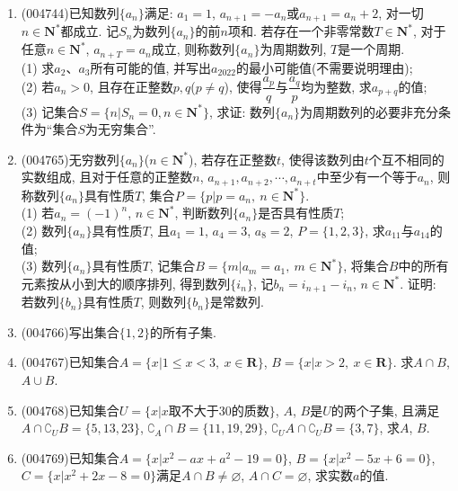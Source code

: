 \documentclass[10pt,a4paper]{article}
\newcommand{\bracket}[1]{(\hbox to #1pt{})}
\newcommand{\fourch}[4]{\par\begin{tabular}{p{.23\textwidth}p{.23\textwidth}p{.23\textwidth}p{.23\textwidth}}
A.~#1 &B.~#2& C.~#3& D.~#4
\end{tabular}}
\begin{document}
\begin{enumerate}[1.]
\textcircled{1}  函数$f_1(x)=kx$包裹函数$f_2(x)=x\cos x$的充要条件是$|k|\ge 1$;
\textcircled{2}  若对于任意$p>0$, $|f_1(x)-f_2(x)|<p$对任意$x\in D$都成立, 则函数$f_1(x)$包裹函数$f_2(x)$;\\
则下列选项正确的是\bracket{20}.
\fourch{\textcircled{1} 真, \textcircled{2} 假}{\textcircled{1} 假, \textcircled{2} 真}{\textcircled{1}、\textcircled{2} 全假}{\textcircled{1}、\textcircled{2} 全真}
\item {\tiny (004744)}已知数列$\{a_n\}$满足: $a_1=1$, $a_{n+1}=-a_n$或$a_{n+1}=a_n+2$, 对一切$n\in \mathbf{N}^*$都成立. 记$S_n$为数列$\{a_n\}$的前$n$项和. 若存在一个非零常数$T\in \mathbf{N}^*$, 对于任意$n\in \mathbf{N}^*$, $a_{n+T}={a_n}$成立, 则称数列$\{a_n\}$为周期数列, $T$是一个周期.\\
(1) 求$a_2$、$a_3$所有可能的值, 并写出$a_{2022}$的最小可能值(不需要说明理由);\\
(2) 若$a_n>0$, 且存在正整数$p,q$($p\ne q$), 使得$\dfrac{a_p}q$与$\dfrac{a_q}p$均为整数, 求$a_{p+q}$的值;\\
(3) 记集合$S=\{n|S_n=0,n\in \mathbf{N}^*\}$, 求证: 数列$\{a_n\}$为周期数列的必要非充分条件为``集合$S$为无穷集合''.
\item {\tiny (004765)}无穷数列$\{a_n\}$($n\in \mathbf{N}^*$), 若存在正整数$t$, 使得该数列由$t$个互不相同的实数组成, 且对于任意的正整数$n$, $a_{n+1},a_{n+2},\cdots,a_{n+t}$中至少有一个等于$a_n$, 则称数列$\{a_n\}$具有性质$T$, 集合$P=\{p|p=a_n, \ n\in \mathbf{N}^*\}$.\\
(1) 若$a_n=(-1)^n$, $n\in \mathbf{N}^*$, 判断数列$\{a_n\}$是否具有性质$T$;\\
(2) 数列$\{a_n\}$具有性质$T$, 且$a_1=1$, $a_4=3$, $a_8=2$, $P=\{1,2,3\}$, 求$a_{11}$与$a_{14}$的值;\\
(3) 数列$\{a_n\}$具有性质$T$, 记集合$B=\{m|a_m=a_1, \ m\in \mathbf{N}^*\}$, 将集合$B$中的所有元素按从小到大的顺序排列, 得到数列$\{i_n\}$, 记$b_n=i_{n+1}-i_n$, $n\in \mathbf{N}^*$. 证明: 若数列$\{b_n\}$具有性质$T$, 则数列$\{b_n\}$是常数列.
\item {\tiny (004766)}写出集合$\{1,2\}$的所有子集.
\item {\tiny (004767)}已知集合$A=\{x|1 \le x<3,\ x\in \mathbf{R}\}$, $B=\{x|x>2,\ x\in \mathbf{R}\}$. 求$A\cap B$, $A\cup B$.
\item {\tiny (004768)}已知集合$U =\{x|x\text{取不大于}30\text{的质数}\}$, $A$, $B$是$U$的两个子集, 且满足$A\cap \complement_UB=\{5,13,23\}$, $\complement_A\cap B=\{11,19,29\}$, $\complement_UA\cap \complement_UB=\{3,7\}$, 求$A$, $B$.
\item {\tiny (004769)}已知集合$A=\{x|x^2- ax+a^2-19=0\}$, $B=\{x|x^2-5x+6=0\}$, $C=\{ x|x^2+2x-8=0\}$满足$A\cap B\ne \varnothing$, $A\cap C=\varnothing$, 求实数$a$的值.

\end{enumerate}
\end{document}
